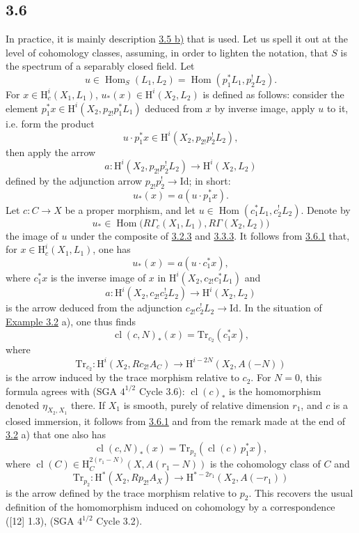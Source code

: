 \documentclass[11pt]{article}
\renewcommand{\H}{\mathrm{H}}
\DeclareMathOperator{\Hom}{Hom}
\providecommand{\Id}{\mathrm{Id}}
\providecommand{\Hom}{\operatorname{Hom}}
\providecommand{\Hom}{\operatorname{Hom}}
\begin{document}
\subsection*{3.6}\label{sga5:III:subsection:3.6}
In practice, it is mainly description \hyperref[sga5:III:corollary:3.5]{3.5 b)} that is used. Let us spell it out at the level of cohomology classes, assuming, in order to lighten the notation, that $S$ is the spectrum of a separably closed field. Let
\[
u\in\Hom_S(L_1,L_2)=\Hom(p_1^*L_1,p_2^!L_2).
\]
For $x\in\H_c^i(X_1,L_1)$, $u_*(x)\in\H^i(X_2,L_2)$ is defined as follows: consider the element $p_1^*x\in\H^i(X_2,p_{2!}p_1^*L_1)$ deduced from $x$ by inverse image, apply $u$ to it, i.e. form the product
\[
u\cdot p_1^*x\in \H^i(X_2,p_{2!}p_2^!L_2),
\]
then apply the arrow
\[
a:\H^i(X_2,p_{2!}p_2^!L_2)\longrightarrow \H^i(X_2,L_2)
\]
defined by the adjunction arrow $p_{2!}p_2^!\to\Id$; in short:
\begin{equation}
u_*(x)=a(u\cdot p_1^*x).
\tag{3.6.1}\label{sga5:III:equation:3.6.1}
\end{equation}
Let $c:C\to X$ be a proper morphism, and let $u\in\Hom(c_1^*L_1,c_2^!L_2)$. Denote by
\[
u_*\in\Hom\bigl(R\Gamma_c(X_1,L_1),R\Gamma(X_2,L_2)\bigr)
\]
the image of $u$ under the composite of \hyperref[sga5:III:equation:3.2.3]{3.2.3} and \hyperref[sga5:III:equation:3.3.3]{3.3.3}. It follows from \hyperref[sga5:III:equation:3.6.1]{3.6.1} that, for $x\in\H_c^i(X_1,L_1)$, one has
\begin{equation}
u_*(x)=a(u\cdot c_1^*x),
\tag{3.6.2}\label{sga5:III:equation:3.6.2}
\end{equation}
where $c_1^*x$ is the inverse image of $x$ in $\H^i(X_2,c_{2!}c_1^*L_1)$ and
\[
a:\H^i(X_2,c_{2!}c_2^!L_2)\longrightarrow \H^i(X_2,L_2)
\]
is the arrow deduced from the adjunction $c_{2!}c_2^!L_2\to\Id$. In the situation of \hyperref[sga5:III:subsection:3.2]{Example 3.2} a), one thus finds
\begin{equation}
\operatorname{cl}(c,N)_*(x)=\mathrm{Tr}_{c_2}(c_1^*x),
\tag{3.6.3}\label{sga5:III:equation:3.6.3}
\end{equation}
where
\[
\mathrm{Tr}_{c_2}:\H^i(X_2,Rc_{2!}A_C)\longrightarrow\H^{i-2N}(X_2,A(-N))
\]
is the arrow induced by the trace morphism relative to $c_2$. For $N=0$, this formula agrees with (SGA $4^{1/2}$ Cycle 3.6): $\operatorname{cl}(c)_*$ is the homomorphism denoted $\eta_{X_2,X_1}$ there. If $X_1$ is smooth, purely of relative dimension $r_1$, and $c$ is a closed immersion, it follows from \hyperref[sga5:III:equation:3.6.1]{3.6.1} and from the remark made at the end of \hyperref[sga5:III:subsection:3.2]{3.2} a) that one also has
\begin{equation}
\operatorname{cl}(c,N)_*(x)=\mathrm{Tr}_{p_2}(\operatorname{cl}(c)\,p_1^*x),
\tag{3.6.4}\label{sga5:III:equation:3.6.4}
\end{equation}
where $\operatorname{cl}(C)\in \H_C^{2(r_1-N)}(X,A(r_1-N))$ is the cohomology class of $C$ and
\[
\mathrm{Tr}_{p_2}:\H^*(X_2,Rp_{2!}A_X)\longrightarrow \H^{*-2r_1}(X_2,A(-r_1))
\]
is the arrow defined by the trace morphism relative to $p_2$. This recovers the usual definition of the homomorphism induced on cohomology by a correspondence ([12] 1.3), (SGA $4^{1/2}$ Cycle 3.2).
\end{document}
